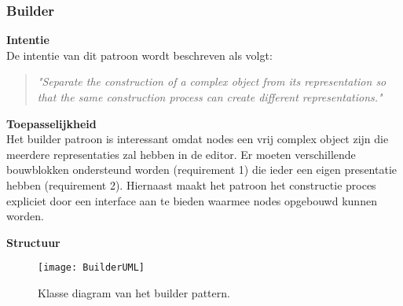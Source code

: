 \subsubsection{Builder}
\noindent\textbf{Intentie}\\
De intentie van dit patroon wordt beschreven als volgt\cite{DesignPatterns}\cite{SourceMakingBuilder}:
\begin{quote} 
    \centering    
    \textit{
        "Separate the construction of a complex object from its representation so that the same construction process can create different representations."        
    }
\end{quote}

\noindent\textbf{Toepasselijkheid}\\
Het builder patroon is interessant omdat nodes een vrij complex object zijn die meerdere representaties zal hebben in de editor. Er moeten verschillende bouwblokken ondersteund worden (requirement 1) die ieder een eigen presentatie hebben (requirement 2). Hiernaast maakt het patroon het constructie proces expliciet door een interface aan te bieden waarmee nodes opgebouwd kunnen worden.
\newline

\noindent\textbf{Structuur}

\begin{figure}[H]
    \centering    
    \texttt{[image: BuilderUML]}
    \caption[]{Klasse diagram van het builder pattern. \footnotemark}
    \label{fig:builderyuml}
\end{figure}

